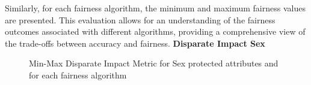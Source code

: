 Similarly, for each fairness algorithm, the minimum and maximum fairness values are presented. This evaluation allows for an understanding of the fairness outcomes associated with different algorithms, providing a comprehensive view of the trade-offs between accuracy and fairness.
\newpage
\textbf{Disparate Impact Sex}
\begin{figure}[H]
    \centering
    \caption{Min-Max Disparate Impact Metric for Sex protected attributes and for each fairness algorithm}
\end{figure}

